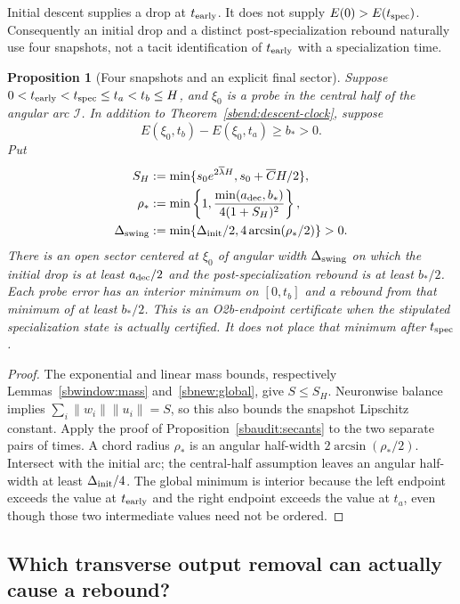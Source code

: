 \documentclass[11pt]{article}
\newtheorem{proposition}[theorem]{Proposition}
\theoremstyle{remark}
\begin{document}
Initial descent supplies a drop at $t_{\rm early}$. It does not supply
$E(0)>E(t_{\rm spec})$. Consequently an initial drop and a distinct
post-specialization rebound naturally use four snapshots, not a tacit
identification of $t_{\rm early}$ with a specialization time.

\begin{proposition}[Four snapshots and an explicit final sector]
\label{sbend:four-snapshots}
Suppose $0<t_{\rm early}<t_{\rm spec}\le t_a<t_b\le H$,
and $\xi_0$ is a probe in the central half of the angular arc
$\mathcal I$. In addition to Theorem~\ref{sbend:descent-clock}, suppose
\[
 E(\xi_0,t_b)-E(\xi_0,t_a)\ge b_*>0.
\]
Put
\begin{align}
 S_H&:=\min\{s_0e^{2\overline\lambda H},
                         s_0+\overline C H/2\},\label{sbend:mass-cap}\\
 \rho_*&:=\min\left\{1,
       \frac{\min(a_{\rm dec},b_*)}{4(1+S_H)^2}\right\},\notag\\
 \Delta_{\rm swing}&:=\min\{\Delta_{\rm init}/2,
                                  4\arcsin(\rho_*/2)\}>0.
 \label{sbend:sector-width}
\end{align}
There is an open sector centered at $\xi_0$ of angular width
$\Delta_{\rm swing}$ on which the initial drop is at least
$a_{\rm dec}/2$ and the post-specialization rebound is at least $b_*/2$.
Each probe error has an interior minimum on $[0,t_b]$ and a rebound from
that minimum of at least $b_*/2$. This is an O2b-endpoint certificate when
the stipulated specialization state is actually certified. It does not
place that minimum after $t_{\rm spec}$.
\end{proposition}
\begin{proof}
The exponential and linear mass bounds, respectively
Lemmas~\ref{sbwindow:mass} and~\ref{sbnew:global}, give $S\le S_H$.
Neuronwise balance implies
$\sum_i\|w_i\|\|u_i\|=S$, so this also bounds the snapshot Lipschitz
constant. Apply the proof of Proposition~\ref{sbaudit:secants} to the
two separate pairs of times. A chord radius $\rho_*$ is an angular
half-width $2\arcsin(\rho_*/2)$. Intersect with the initial arc; the
central-half assumption leaves an angular half-width at least
$\Delta_{\rm init}/4$.
The global minimum is interior because the left endpoint exceeds the
value at $t_{\rm early}$ and the right endpoint exceeds the value at
$t_a$, even though those two intermediate values need not be ordered.
\end{proof}

\subsection{Which transverse output removal can actually cause a rebound?}
\end{document}
